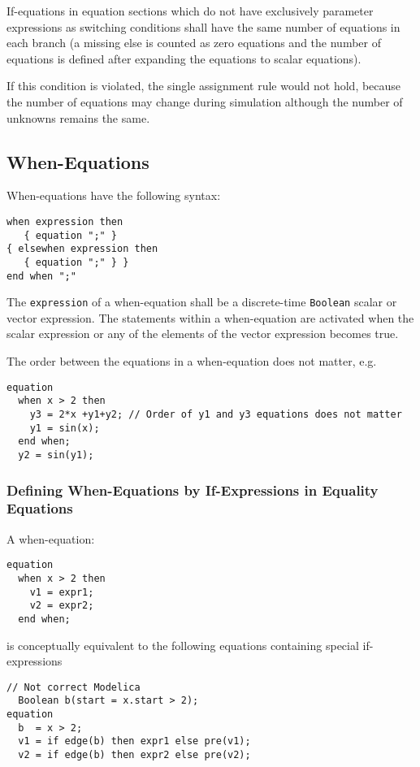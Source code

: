 If-equations in equation sections which do not have exclusively
parameter expressions as switching conditions shall have the same number
of equations in each branch (a missing else is counted as zero equations
and the number of equations is defined after expanding the equations to
scalar equations).

\begin{nonnormative}
If this condition is violated, the single assignment rule would not hold, because the number of equations may change during simulation
although the number of unknowns remains the same.
\end{nonnormative}

\subsection{When-Equations}\label{when-equations}

When-equations have the following syntax:
\begin{lstlisting}[language=grammar]
when expression then
   { equation ";" }
{ elsewhen expression then
   { equation ";" } }
end when ";"
\end{lstlisting}

The \lstinline!expression! of a when-equation shall be a discrete-time \lstinline!Boolean! scalar or vector expression.  The statements within a when-equation are activated when the scalar expression or any of the elements of the vector expression becomes true.

\begin{example}
The order between the equations in a when-equation does not matter, e.g.
\begin{lstlisting}[language=modelica]
equation
  when x > 2 then
    y3 = 2*x +y1+y2; // Order of y1 and y3 equations does not matter
    y1 = sin(x);
  end when;
  y2 = sin(y1);
\end{lstlisting}
\end{example}

\subsubsection{Defining When-Equations by If-Expressions in Equality Equations}\label{defining-when-equations-by-if-expressions-in-equality-equations}

A when-equation:
\begin{lstlisting}[language=modelica]
equation
  when x > 2 then
    v1 = expr1;
    v2 = expr2;
  end when;
\end{lstlisting}
is conceptually equivalent to the following equations containing special if-expressions
\begin{lstlisting}[language=modelica]
  // Not correct Modelica
  Boolean b(start = x.start > 2);
equation
  b  = x > 2;
  v1 = if edge(b) then expr1 else pre(v1);
  v2 = if edge(b) then expr2 else pre(v2);
\end{lstlisting}

